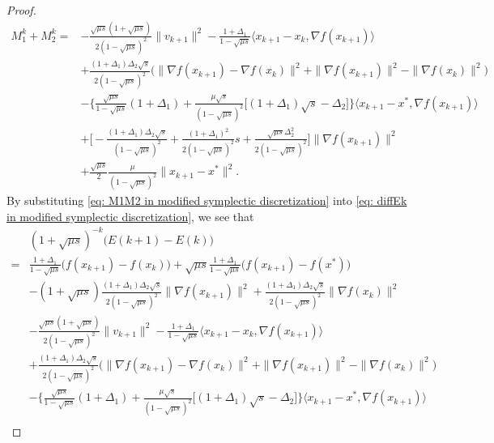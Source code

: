 \documentclass[10pt,a4paper]{amsart}
\begin{document}
\begin{proof}
{        \begin{equation}
        \label{eq: M1M2 in modified symplectic discretization}
        \begin{aligned}
                M_1^k+M_2^k=&-\frac{\sqrt{\mu s}(1+\sqrt{\mu s})}{2(1-\sqrt{\mu s})^2}\|v_{k+1}\|^2
        -\frac{1+\Delta_1}{1-\sqrt{\mu s}}\langle x_{k+1}-x_k,\nabla f(x_{k+1})\rangle\\
        &+\frac{(1+\Delta_1)\Delta_2\sqrt{s}}{2(1-\sqrt{\mu s})^2}\big(\|\nabla f(x_{k+1})-\nabla f(x_k)\|^2+\|\nabla f(x_{k+1})\|^2-\|\nabla f(x_k)\|^2\big)\\
        &-\Big\{\frac{\sqrt{\mu s}}{1-\sqrt{\mu s}}(1+\Delta_1)+\frac{\mu\sqrt{s}}{(1-\sqrt{\mu s})^2}\big[(1+\Delta_1)\sqrt{s}-\Delta_2\big]\Big\}\langle x_{k+1}-x^*,\nabla f(x_{k+1})\rangle\\
        &+\big[-\frac{(1+\Delta_1)\Delta_2\sqrt{s}}{(1-\sqrt{\mu s})^2}+\frac{(1+\Delta_1)^2}{2(1-\sqrt{\mu s})^2}s+\frac{\sqrt{\mu s}\Delta_2^2}{2(1-\sqrt{\mu s})^2}\big]\|\nabla f(x_{k+1})\|^2\\
        &+\frac{\sqrt{\mu s}}{2}\frac{\mu}{(1-\sqrt{\mu s})^2}\|x_{k+1}-x^*\|^2.
        \end{aligned}
       \end{equation}
       By substituting \eqref{eq: M1M2 in modified symplectic discretization} into \eqref{eq: diffEk in modified symplectic discretization}, we see that
       \begin{align*}
           &(1+\sqrt{\mu s})^{-k}\big(E(k+1)-E(k)\big)\\
           =&\frac{1+\Delta_1}{1-\sqrt{\mu s}}\big(f(x_{k+1})-f(x_k)\big)+\sqrt{\mu s}\frac{1+\Delta_1}{1-\sqrt{\mu s}}\big(f(x_{k+1})-f(x^*)\big)\\
		&-(1+\sqrt{\mu s})\frac{(1+\Delta_1)\Delta_2\sqrt{s}}{2(1-\sqrt{\mu s})^2}\|\nabla f(x_{k+1})\|^2+\frac{(1+\Delta_1)\Delta_2\sqrt{s}}{2(1-\sqrt{\mu s})^2}\|\nabla f(x_k)\|^2\\
        &-\frac{\sqrt{\mu s}(1+\sqrt{\mu s})}{2(1-\sqrt{\mu s})^2}\|v_{k+1}\|^2
        -\frac{1+\Delta_1}{1-\sqrt{\mu s}}\langle x_{k+1}-x_k,\nabla f(x_{k+1})\rangle\\
        &+\frac{(1+\Delta_1)\Delta_2\sqrt{s}}{2(1-\sqrt{\mu s})^2}\big(\|\nabla f(x_{k+1})-\nabla f(x_k)\|^2+\|\nabla f(x_{k+1})\|^2-\|\nabla f(x_k)\|^2\big)\\
        &-\Big\{\frac{\sqrt{\mu s}}{1-\sqrt{\mu s}}(1+\Delta_1)+\frac{\mu\sqrt{s}}{(1-\sqrt{\mu s})^2}\big[(1+\Delta_1)\sqrt{s}-\Delta_2\big]\Big\}\langle x_{k+1}-x^*,\nabla f(x_{k+1})\rangle\\

\end{align*}}
\end{proof}
\end{document}
